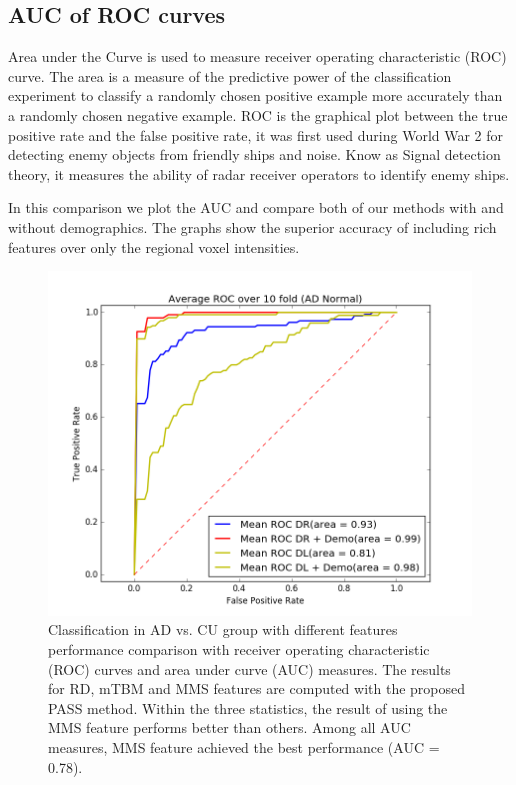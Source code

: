 \subsection{AUC of ROC curves}
Area under the Curve is used to measure receiver operating characteristic (ROC) curve. The area is a measure of the predictive power of the classification experiment to classify a  randomly chosen positive example more accurately than a randomly chosen negative example. ROC is the graphical plot between the true positive rate and the false positive rate, it was first used during World War 2 for detecting enemy objects from friendly ships and noise. Know as Signal detection theory, it measures the ability of radar receiver operators to identify enemy ships. 

In this comparison we plot the AUC and compare both of our methods with and without demographics. The graphs show the superior accuracy of including rich features over only the regional voxel intensities. 
\begin{figure}
	\centering
	\includegraphics[width=\linewidth]{figures/AD_CU}
	\caption[ROC for AD vs. CU]{Classification in AD vs. CU group with different features performance comparison with receiver operating characteristic (ROC) curves and area under curve (AUC) measures. The results for RD, mTBM and MMS features are computed with the proposed PASS method. Within the three statistics, the result of using the MMS feature performs better than others. Among all AUC measures, MMS feature achieved the best performance (AUC = 0.78).}
	\label{fig:adcu}
\end{figure}
